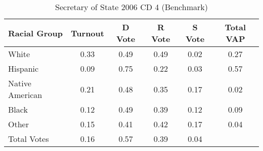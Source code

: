 \begin{table}[htb]
\begin{center}
\caption{Secretary of State 2006 CD 4 (Benchmark)}
\label{sos06_vap_cd_4_benchmark}
\begin{tabular}{lccccc}
  \hline
Racial Group & Turnout & D Vote & R Vote & S Vote & Total VAP \\ 
  \hline
White & 0.33 & 0.49 & 0.49 & 0.02 & 0.27 \\ 
  Hispanic & 0.09 & 0.75 & 0.22 & 0.03 & 0.57 \\ 
  Native American & 0.21 & 0.48 & 0.35 & 0.17 & 0.02 \\ 
  Black & 0.12 & 0.49 & 0.39 & 0.12 & 0.09 \\ 
  Other & 0.15 & 0.41 & 0.42 & 0.17 & 0.04 \\ 
  Total Votes & 0.16 & 0.57 & 0.39 & 0.04 &  \\ 
   \hline
\end{tabular}
\end{center}
\end{table}
